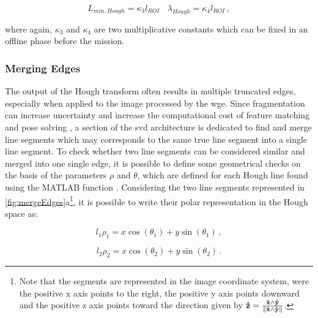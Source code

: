 \begin{equation*}
L_{min,Hough} = \kappa_3 l_{ROI} \ \ \ \  \lambda_{Hough} = \kappa_4 l_{ROI}  \,,
\end{equation*}

where again, $\kappa_3$ and $\kappa_4$  are two multiplicative constants which can be fixed in an offline phase before the mission.

\subsubsection{Merging Edges}
The output of the Hough transform often results in multiple truncated edges, especially when applied to the image processed by the \acrshort{wge}. Since fragmentation can increase uncertainty and increase the computational cost of feature matching and pose solving \cite{fracchio2019}, a section of the \acrshort{svd} architecture is dedicated to find and merge line segments which may corresponds to the same true line segment into a single line segment.
To check whether two line segments can be considered similar and merged into one single edge, it is possible to define some geometrical checks on the basis of the parameters $\rho$ and $\theta$, which are defined for each Hough line found using the MATLAB function .
Considering the two line segments represented in \ref{fig:mergeEdges}a\footnote{Note that the segments are represented in the image coordinate system, were the positive x axis points to the right, the positive y axis points downward and the positive z axis points toward the direction given by $  \mathbf{\hat{z}} = \frac{\mathbf{\hat{x}} \wedge \mathbf{\hat{y}}}{\left\lVert\mathbf{\hat{x}} \wedge \mathbf{\hat{y}}\right\rVert}$.}, it is possible to write their polar representation in the Hough space as:

\begin{equation}
l_1 \rho_1 = x \cos (\theta_1) +  y \sin (\theta_1) \,,
\end{equation}

\begin{equation}
l_2 \rho_2 = x \cos (\theta_2) +  y \sin (\theta_2) \,.
\end{equation}

